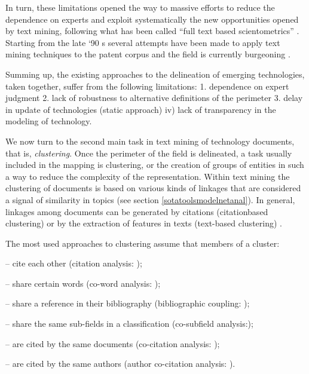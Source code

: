 \documentclass[]{book}
\theoremstyle{definition}
\theoremstyle{definition}
\theoremstyle{definition}
\theoremstyle{remark}
\begin{document}
In turn, these limitations opened the way to massive efforts to reduce
the dependence on experts and exploit systematically the new
opportunities opened by text mining, following what has been called
``full text based scientometrics'' \citep{boyack2013improving}. Starting
from the late `90 s several attempts have been made to apply text mining
techniques to the patent corpus and the field is currently burgeoning
\citep{joung2017monitoring, ozcan2017patent}.

Summing up, the existing approaches to the delineation of emerging
technologies, taken together, suffer from the following limitations: 1.
dependence on expert judgment 2. lack of robustness to alternative
definitions of the perimeter 3. delay in update of technologies (static
approach) iv) lack of transparency in the modeling of technology.

We now turn to the second main task in text mining of technology
documents, that is, \emph{clustering}. Once the perimeter of the field
is delineated, a task usually included in the mapping is clustering, or
the creation of groups of entities in such a way to reduce the
complexity of the representation. Within text mining the clustering of
documents is based on various kinds of linkages that are considered a
signal of similarity in topics (see section
\ref{sotatoolsmodelnetanal}). In general, linkages among documents can
be generated by citations (citationbased clustering) or by the
extraction of features in texts (text-based clustering)
\citep{leydesdorff2006measuring, wang2017clustering, jaffe1993geographic}.

The most used approaches to clustering assume that members of a cluster:

-- cite each other (citation analysis:
\citep{jaffe1993geographic, moed2006citation, verspagen2007mapping, lee2017knowledge});

-- share certain words (co-word analysis:
\citep{callon1983translations, rip1984co, leydesdroff1989words, engelsman1994patent, van1993neural, yoon2004text});

-- share a reference in their bibliography (bibliographic coupling:
\citep{glanzel1996new, kuusi2007anticipating});

-- share the same sub-fields in a classification (co-subfield
analysis:\citep{chang2009using});

-- are cited by the same documents (co-citation analysis:
\citep{small1973co, small1985clustering});

-- are cited by the same authors (author co-citation analysis:
\citep{white1981author}).
\end{document}
